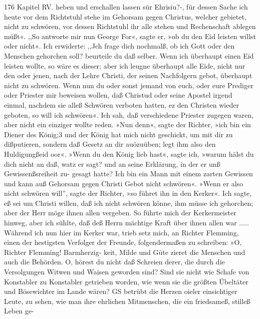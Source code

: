 176 Kapitel RV.
heben und erschallen lassen sür Ehrisiu?-, für dessen Sache ich
heute vor dem Richtstuhl stehe im Gehorsam gegen Christus,
welcher gebietet, nicht zu schwören, vor dessen Richtstuhl ihr alle
stehen und Rechenschaft ablegen müßt«. ,,So antworte mir nun
George For«, sagte er, »ob du den Eid leisten willst oder nicht«.
Ich erwiderte: ,,Jch frage dich nochmalß, ob ich Gott oder den
Menschen gehorchen soll? beurteile du daß selber. Wenn ich
überhaupt einen Eid leisten wollte, so wäre es dieser; aber ich
leugne überhaupt alle Eide, nicht nur den oder jenen, nach der
Lehre Christi, der seinen Nachfolgern gebot, überhaupt nicht zu
schwören. Wenn nun du oder sonst jemand von euch, oder eure
Prediger oder Priester mir beweisen wollen, daß Christud oder
seine Apostel irgend einmal, nachdem sie alleß Schwören verboten
hatten, ez den Christen wieder geboten, so will ich schwören«.
Ich sah, daß verschiedene Priester zugegen waren, aber nicht ein
einziger wollte reden. »Nun denn«, sagte der Richter, »ich bin
ein Diener des König;3 und der König hat mich nicht geschickt,
um mit dir zu dißputieren, sondern daß Gesetz an dir auözuüben;
legt ihm also den Huldigungßeid oor«. »Wenn du den König
lieb hast«, sagte ich, »warum hälst du dich nicht an daß, watz er
sagt? und an seine Erklärung, in der er unß Gewissenßsreiheit zu-
gesagt hatte? Ich bin ein Mann mit einem zarten Gewissen und
kann auß Gehorsam gegen Christi Gebot nicht schwören«. »Wenn
er also nicht schwören will'', sagte der Richter, »so führet ihn
in den Kerker«. Ich sagte, eß sei um Christi willen, daß ich
nicht schwören könne, ihm müsse ich gehorchen; aber der Herr
möge ihnen allen vergeben. So führte mich der Kerkermeister
hinweg, aber ich sühlte, daß deß Herrn mächtige Kraft über ihnen
allen war .....
Während ich nun hier im Kerker war, trieb setz mich, an
Richter Flemming, einen der hestigsten Verfolger der Freunde,
folgendermaßen zu schreiben: »O, Richter Flemming! Barmherzig-
keit, Milde und Güte zieret die Menschen und auch die Behörden.
O, hörest du nicht daß Schreien derer, die durch die Versolgungen
Witwen und Waisen geworden sind? Sind sie nicht wie
Schafe von Konstabler zu Konstabler getrieben worden, wie wenn
sie die größten Übeltäter und Bösewichter im Lande wären? GS
betrübt die Herzen oieler einsichtiger Leute, zu sehen, wie man
ihre ehrlichen Mitmenschen, die ein friedsameß, stilleß Leben ge-


